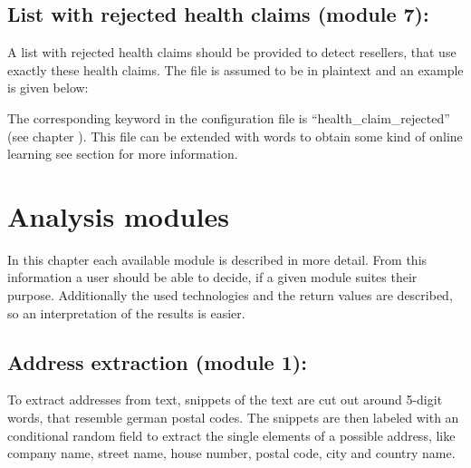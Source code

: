 \documentclass[letterpaper,10pt,english]{sphinxmanual}
\begin{document}
\section{List with rejected health claims (module 7):}
\label{\detokenize{external_data:list-with-rejected-health-claims-module-7}}\label{\detokenize{external_data:external-hc-rejected}}
A list with rejected health claims should be provided to detect
resellers, that use exactly these health claims. The file is assumed
to be in plaintext and an example is given below:

%
\begin{sphinxVerbatim}[commandchars=\\\{\}]
  
   
\end{sphinxVerbatim}

The corresponding keyword in the configuration file is
“health\_claim\_rejected” (see chapter {\hyperref[\detokenize{configuration:configuration}]{}}). This file
can be extended with words to obtain some kind of online learning see
section {\hyperref[\detokenize{online_learning:rejected-online}]{}} for more information.


\chapter{Analysis modules}
\label{\detokenize{modules:modules}}\label{\detokenize{modules::doc}}\label{\detokenize{modules:analysis-modules}}
In this chapter each available module is described in more
detail. From this information a user should be able to decide, if a
given module suites their purpose. Additionally the used technologies
and the return values are described, so an interpretation of the
results is easier.


\section{Address extraction (module 1):}
\label{\detokenize{modules:address-extraction-module-1}}
To extract addresses from text, snippets of the text are cut out
around 5-digit words, that resemble german postal codes. The snippets
are then labeled with an conditional random field to extract the
single elements of a possible address, like company name, street name,
house number, postal code, city and country name.
\end{document}
